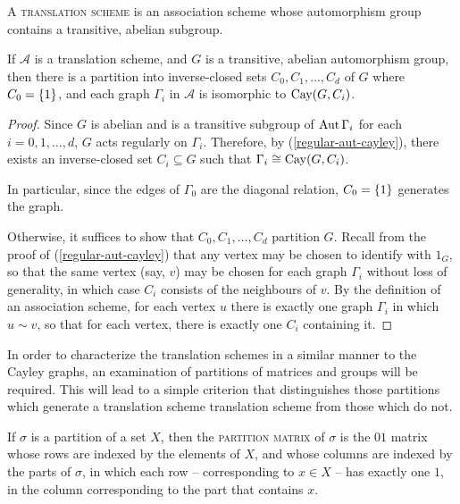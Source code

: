 \documentclass{report}
\newcommand{\AS}{\mathcal{A}}
\begin{document}
    \begin{defn}\label{translation-scheme}
      A \textsc{translation scheme} is an association scheme whose
      automorphism group contains a transitive, abelian subgroup.
    \end{defn}

    \begin{lem}\label{translation-partition}
      If $\AS$ is a translation scheme,
      and $G$ is a transitive, abelian automorphism group,
      then there is a partition into inverse-closed sets
      $C_0, C_1, \ldots, C_d$ of $G$ where $C_0 = \left\lbrace 1 \right\rbrace$,
      and each graph $\Gamma_i$ in $\AS$ is isomorphic to $\operatorname{Cay}(G, C_i)$.
    \end{lem}

    \begin{proof}
      Since $G$ is abelian and is a transitive subgroup of $\operatorname{Aut} \Gamma_i$ for
      each $i = 0, 1, \ldots, d$, $G$ acts regularly on $\Gamma_i$.
      Therefore, by (\ref{regular-aut-cayley}), there exists an inverse-closed
      set $C_i \subseteq G$ such that $\Gamma_i \cong \operatorname{Cay}(G, C_i)$.

      In particular, since the edges of $\Gamma_0$ are the diagonal relation,
      $C_0 = \left\lbrace 1 \right\rbrace$ generates the graph.

      Otherwise, it suffices to show that $C_0, C_1, \ldots, C_d$ partition $G$.
      Recall from the proof of (\ref{regular-aut-cayley}) that any vertex may be
      chosen to identify with $1_G$, so that the same vertex (say, $v$)
      may be chosen for each graph $\Gamma_i$ without loss of generality,
      in which case $C_i$ consists of the neighbours of $v$.  By the definition
      of an association scheme, for each vertex $u$ there is exactly one
      graph $\Gamma_i$ in which $u \sim v$, so that for each vertex, there is
      exactly one $C_i$ containing it.
    \end{proof}

    In order to characterize the translation schemes in a similar manner to the
    Cayley graphs, an examination of partitions of matrices and groups will be
    required.  This will lead to a simple criterion that distinguishes those
    partitions which generate a translation scheme translation scheme from those
    which do not.  \cite[Section~12.10]{godsil}

    \begin{defn}\label{partition-matrix}
      If $\sigma$ is a partition of a set $X$,
      then the \textsc{partition matrix} of $\sigma$
      is the $01$ matrix
      whose rows are indexed by the elements of $X$,
      and whose columns are indexed by the parts of $\sigma$,
      in which each row -- corresponding to $x \in X$ -- has exactly one $1$,
      in the column corresponding to the part that contains $x$.
    \end{defn}
\end{document}
